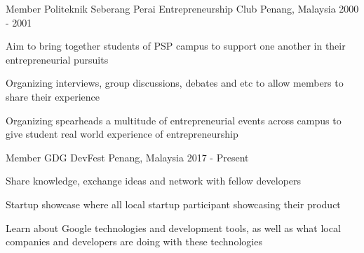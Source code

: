 \begin{cventries}
  \cventry
    {Member} %
    {Politeknik Seberang Perai Entrepreneurship Club} %
    {Penang, Malaysia} %
    {2000 - 2001} %
    {
      \begin{cvitems} %
        \item {Aim to bring together students of PSP campus to support one another in their entrepreneurial pursuits}
        \item {Organizing interviews, group discussions, debates and etc to allow members to share their experience}
        \item {Organizing spearheads a multitude of entrepreneurial events across campus to give student real world experience of entrepreneurship}
      \end{cvitems}
    }
    
  \cventry
    {Member} %
    {GDG DevFest} %
    {Penang, Malaysia} %
    {2017 - Present} %
    {
      \begin{cvitems} %
      	\item {Share knowledge, exchange ideas and network with fellow developers}
      	\item {Startup showcase where all local startup participant showcasing their product}
        \item {Learn about Google technologies and development tools, as well as what local companies and developers are doing with these technologies}
      \end{cvitems}
    }

\end{cventries}
